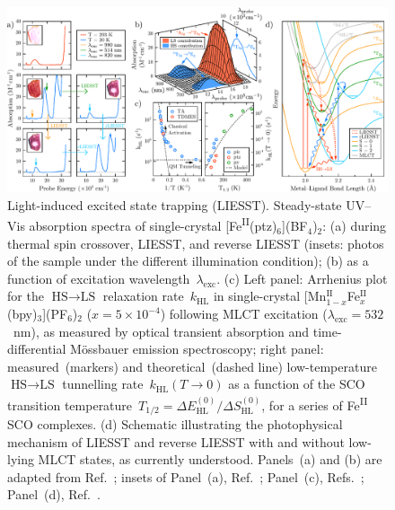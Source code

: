 \begin{figure}[t!]
  \centering
  \includegraphics[width = \textwidth]{Figures/fig_SCO_LIESST.pdf}
  \caption[Light-induced excited state trapping (LIESST).]{
    Light-induced excited state trapping (LIESST).
    Steady-state UV--Vis absorption spectra of
    single-crystal [Fe\textsuperscript{II}(ptz)$_6$](BF$_4$)$_2$:
    (a) during thermal spin crossover, LIESST, and reverse LIESST
    (insets: photos of the sample under the different illumination condition);
    (b) as a function of excitation wavelength~$\lambda_\text{exc}$.
    (c) Left panel: Arrhenius plot for the $\text{HS} \rightarrow \text{LS}$ relaxation rate~$k_\text{HL}$
    in single-crystal [Mn$_{1-x}^\text{II}$Fe$_x^\text{II}$(bpy)$_3$](PF$_6$)$_2$
    ($x = 5 \times 10^{-4}$) following MLCT excitation ($\lambda_\text{exc} = 532$~nm),
    as measured by optical transient absorption and time-differential
    M\"{o}ssbauer emission spectroscopy;
    right panel: measured~(markers) and theoretical~(dashed line)
    low-temperature $\text{HS} \rightarrow \text{LS}$ tunnelling rate~$k_\text{HL}(T \rightarrow 0)$
    as a function of the SCO transition
    temperature~$T_{1/2} = \Delta E_\text{HL}^{(0)} / \Delta S_\text{HL}^{(0)}$,
    for a series of Fe\textsuperscript{II} SCO complexes.
    (d) Schematic illustrating the photophysical mechanism of LIESST
    and reverse LIESST with and without low-lying MLCT states,
    as currently understood.
    Panels~(a) and (b) are adapted from Ref.~\cite{Hauser1991a};
    insets of Panel~(a), Ref.~\cite{Gutlich2012};
    Panel~(c), Refs.~\cite{Deisenroth1994, Hauser1991c};
    Panel~(d), Ref.~\cite{Hauser2017}.
  }
  \label{fig: SCO-LIESST}
\end{figure}

